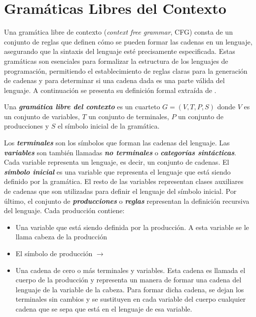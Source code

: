 \section{Gram\'aticas Libres del Contexto}\label{section:freecontenxtgrammar}

Una gramática libre de contexto (\emph{context free grammar}, CFG) consta de un conjunto de reglas que definen cómo se pueden 
formar las cadenas en un lenguaje, asegurando que la sintaxis del lenguaje esté precisamente especificada. 
Estas gramáticas son esenciales para formalizar la estructura de los lenguajes de programación, permitiendo 
el establecimiento de reglas claras para la generación de cadenas y para determinar si una cadena dada es 
una parte válida del lenguaje. A continuaci\'on se presenta su definici\'on formal 
extra\'ida de \cite{hopcroft_introduction_2007}.

\begin{definition}
    Una \textbf{\textit{gramática libre del contexto}} es un cuarteto $G=(V, T, P, S)$ donde $V$ es un 
    conjunto de variables, $T$ un conjunto de terminales, $P$ un conjunto de producciones y $S$ el símbolo 
    inicial de la gramática.
\end{definition}

Los \textbf{\textit{terminales}} son los símbolos que forman las cadenas del lenguaje. Las \textbf{\textit{variables}} 
son tambi\'en llamadas \textbf{\textit{no terminales}} o \textbf{\textit{categor\'ias sintácticas}}. Cada variable
representa un lenguaje, es decir, un conjunto de cadenas. El \textbf{\textit{símbolo inicial}} es una variable 
que representa el lenguaje que est\'a siendo definido por la gramática. El resto de las variables representan 
clases auxiliares de cadenas que son utilizadas para definir el lenguaje del símbolo inicial. Por \'ultimo, el 
conjunto de \textbf{\textit{producciones}} o \textbf{\textit{reglas}} representan la definici\'on recursiva 
del lenguaje. Cada producción contiene:

\begin{itemize}
    \item Una variable que est\'a siendo definida por la producción. A esta variable se le llama 
        cabeza de la producción
    \item El símbolo de producción $\rightarrow$ 
    \item Una cadena de cero o m\'as terminales y variables. Esta cadena es llamada el cuerpo de la 
        producción y representa un manera de formar una cadena del lenguaje de la variable de la cabeza. Para formar 
        dicha cadena, se dejan los terminales sin cambios y se sustituyen en cada variable del cuerpo cualquier 
        cadena que se sepa que está en el lenguaje de esa variable.
\end{itemize}